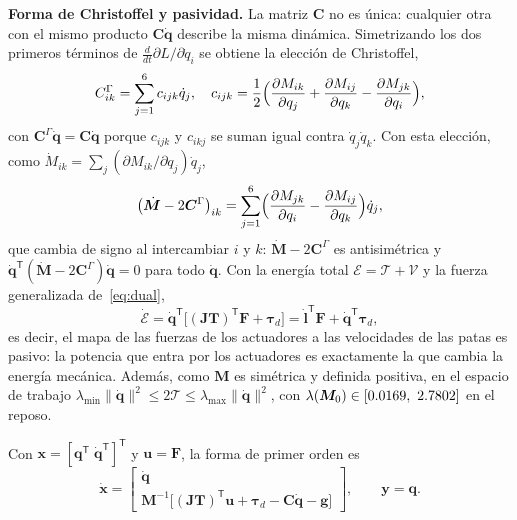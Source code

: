 \documentclass[conference]{IEEEtran}
\newcommand{\vect}[1]{\bm{#1}}
\newcommand{\T}{^{\mathsf{T}}}
\begin{document}
\textbf{Forma de Christoffel y pasividad.} La matriz $\vect C$ no es única: cualquier otra con el mismo producto $\vect C\dot{\vect q}$ describe la misma dinámica. Simetrizando los dos primeros términos de $\frac{d}{dt}\partial L/\partial\dot q_i$ se obtiene la elección de Christoffel,
\begin{equation}
C^{\Gamma}_{ik} = \sum_{j=1}^6c_{ijk}\dot q_j,\quad c_{ijk} = \frac12\Bigl(\frac{\partial M_{ik}}{\partial q_j} + \frac{\partial M_{ij}}{\partial q_k} - \frac{\partial M_{jk}}{\partial q_i}\Bigr),
\label{eq:christoffel}
\end{equation}
con $\vect C^\Gamma\dot{\vect q} = \vect C\dot{\vect q}$ porque $c_{ijk}$ y $c_{ikj}$ se suman igual contra $\dot q_j\dot q_k$. Con esta elección, como $\dot M_{ik} = \sum_j(\partial M_{ik}/\partial q_j)\dot q_j$,
\begin{equation}
\bigl(\dot{\vect M} - 2\vect C^\Gamma\bigr)_{ik} = \sum_{j=1}^6\Bigl(\frac{\partial M_{jk}}{\partial q_i} - \frac{\partial M_{ij}}{\partial q_k}\Bigr)\dot q_j ,
\end{equation}
que cambia de signo al intercambiar $i$ y $k$: $\dot{\vect M} - 2\vect C^\Gamma$ es antisimétrica y $\dot{\vect q}\T(\dot{\vect M} - 2\vect C^\Gamma)\dot{\vect q} = 0$ para todo $\dot{\vect q}$. Con la energía total $\mathcal E = \mathcal T + \mathcal V$ y la fuerza generalizada de~\eqref{eq:dual},
\begin{equation}
\dot{\mathcal E} = \dot{\vect q}\T\bigl[(\vect J\vect T)\T\vect F + \vect\tau_d\bigr] = \dot{\vect l}\T\vect F + \dot{\vect q}\T\vect\tau_d ,
\end{equation}
es decir, el mapa de las fuerzas de los actuadores a las velocidades de las patas es pasivo: la potencia que entra por los actuadores es exactamente la que cambia la energía mecánica. Además, como $\vect M$ es simétrica y definida positiva, en el espacio de trabajo $\lambda_{\min}\lVert\dot{\vect q}\rVert^2 \le 2\mathcal T \le \lambda_{\max}\lVert\dot{\vect q}\rVert^2$, con $\lambda(\vect M_0)\in[\MzeroEigMin,\ 2.7802]$ en el reposo.

Con $\vect x = [\vect q\T\;\dot{\vect q}\T]\T$ y $\vect u = \vect F$, la forma de primer orden es
\begin{equation}
\dot{\vect x} = \begin{bmatrix}\dot{\vect q}\\ \vect M^{-1}\bigl[(\vect J\vect T)\T\vect u + \vect\tau_d - \vect C\dot{\vect q} - \vect g\bigr]\end{bmatrix},\qquad \vect y = \vect q .
\label{eq:fnl}
\end{equation}
\end{document}
